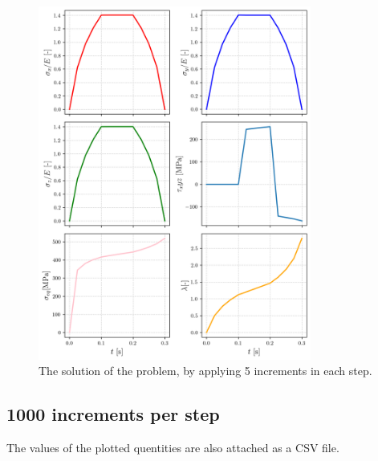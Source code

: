 \documentclass[12pt,a4paper]{article}
\begin{document}
\begin{figure}[h]
    \centering
    \includegraphics[width=0.8\textwidth]{figures/sol_5incr.png}
    \caption{The solution of the problem, by applying 5 increments in each step.}
    \label{fig:sol_5incr}
\end{figure}

\newpage

\subsection*{1000 increments per step}

The values of the plotted quentities are also attached as a CSV file.
\end{document}
